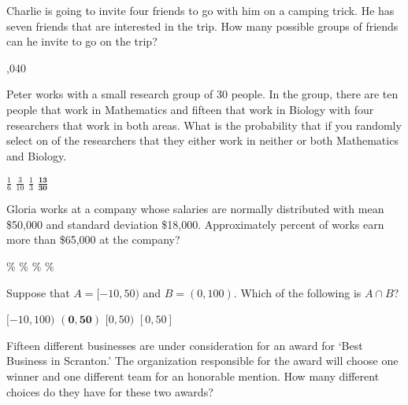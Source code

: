 \documentclass[12pt,letterpaper,answers]{exam}
\begin{document}
\begin{questions}
\vfill

\question Charlie is going to invite four friends to go with him on a camping trick. He has seven friends that are interested in the trip. How many possible groups of friends can he invite to go on the trip?
	\begin{choices}
	,040
	\end{choices}

\vfill
\newpage

\question Peter works with a small research group of 30 people. In the group, there are ten people that work in Mathematics and fifteen that work in Biology with four researchers that work in both areas. What is the probability that if you randomly select on of the researchers that they either work in neither or both Mathematics and Biology.
	\begin{choices}
	\choice $\frac{1}{6}$
	\choice $\frac{3}{10}$
	\choice $\frac{1}{3}$
	\CorrectChoice $\mathbf{\frac{13}{30}}$
	\end{choices}

\vfill

\question Gloria works at a company whose salaries are normally distributed with mean \$50,000 and standard deviation \$18,000. Approximately percent of works earn more than \$65,000 at the company?
	\begin{choices}
	\%
	\%
	\%
	\%
	\end{choices}

\vfill

\question Suppose that $A= [-10, 50)$ and $B= (0, 100)$. Which of the following is $A \cap B$?
	\begin{choices}
	\choice $[-10, 100)$
	\CorrectChoice $\mathbf{(0, 50)}$
	\choice $[0, 50)$
	\choice $[0, 50]$
	\end{choices}

\vfill

\question Fifteen different businesses are under consideration for an award for `Best Business in Scranton.' The organization responsible for the award will choose one winner and one different team for an honorable mention. How many different choices do they have for these two awards?
	\begin{choices}
	\choice 2
	\choice 15
	\choice 105
	\CorrectChoice 210
	\end{choices}




\end{questions}
\end{document}
